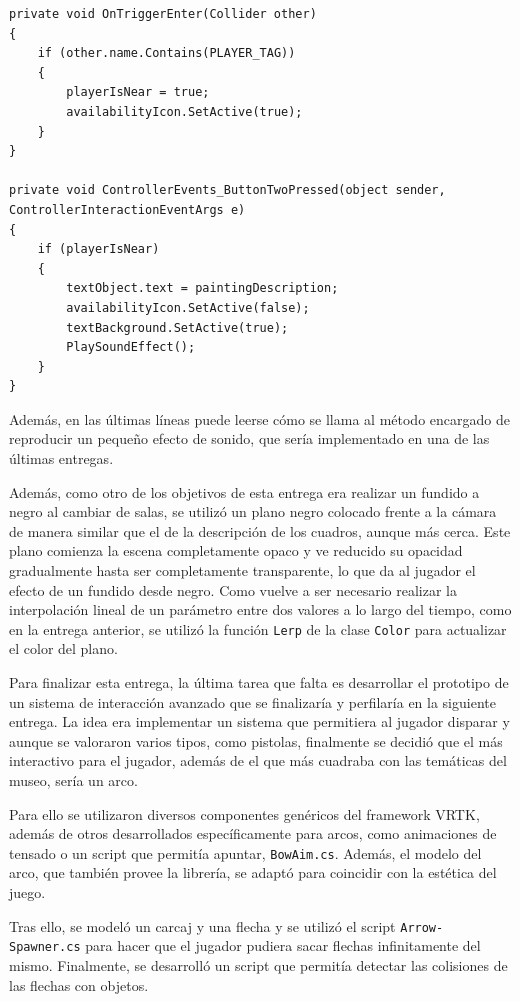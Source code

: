 \begin{lstlisting}[caption=Fragmento del script para activar la descripción de los cuadros, label=lst:painting-description]
private void OnTriggerEnter(Collider other)
{
    if (other.name.Contains(PLAYER_TAG))
    {
        playerIsNear = true;
        availabilityIcon.SetActive(true);
    }
}
    
private void ControllerEvents_ButtonTwoPressed(object sender, ControllerInteractionEventArgs e)
{
    if (playerIsNear)
    {
        textObject.text = paintingDescription;
        availabilityIcon.SetActive(false);
        textBackground.SetActive(true);
        PlaySoundEffect();
    }
}
\end{lstlisting}

Además, en las últimas líneas puede leerse cómo se llama al método encargado de reproducir un pequeño efecto de sonido, que sería implementado en una de las últimas entregas.

Además, como otro de los objetivos de esta entrega era realizar un fundido a negro al cambiar de salas, se utilizó un plano negro colocado frente a la cámara de manera similar que el de la descripción de los cuadros, aunque más cerca. Este plano comienza la escena completamente opaco y ve reducido su opacidad gradualmente hasta ser completamente transparente, lo que da al jugador el efecto de un fundido desde negro. Como vuelve a ser necesario realizar la interpolación lineal de un parámetro entre dos valores a lo largo del tiempo, como en la entrega anterior, se utilizó la función \texttt{Lerp} de la clase \texttt{Color} para actualizar el color del plano.

Para finalizar esta entrega, la última tarea que falta es desarrollar el prototipo de un sistema de interacción avanzado que se finalizaría y perfilaría en la siguiente entrega. La idea era implementar un sistema que permitiera al jugador disparar y aunque se valoraron varios tipos, como pistolas, finalmente se decidió que el más interactivo para el jugador, además de el que más cuadraba con las temáticas del museo, sería un arco.

Para ello se utilizaron diversos componentes genéricos del framework \acs{VRTK}, además de otros desarrollados específicamente para arcos, como animaciones de tensado o un script que permitía apuntar, \texttt{BowAim.cs}. Además, el modelo del arco, que también provee la librería, se adaptó para coincidir con la estética del juego.

Tras ello, se modeló un carcaj y una flecha y se utilizó el script \texttt{Arrow-} \texttt{Spawner.cs} para hacer que el jugador pudiera sacar flechas infinitamente del mismo. Finalmente, se desarrolló un script que permitía detectar las colisiones de las flechas con objetos.

